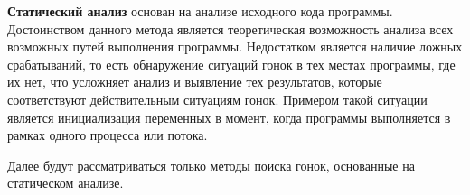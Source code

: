 \textbf{Статический анализ} основан на анализе исходного кода программы. Достоинством данного метода является теоретическая возможность анализа всех возможных путей выполнения программы.  Недостатком является наличие ложных срабатываний, то есть обнаружение ситуаций гонок в тех местах программы, где их нет, что усложняет анализ и выявление тех результатов, которые соответствуют действительным ситуациям гонок. Примером такой ситуации является инициализация переменных в момент, когда программы выполняется в рамках одного процесса или потока.

Далее будут рассматриваться только методы поиска гонок, основанные на статическом анализе.
